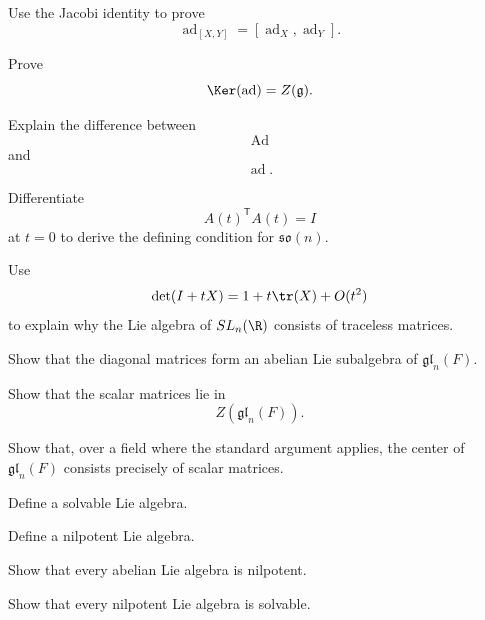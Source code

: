 \begin{exercise}[2]
Use the Jacobi identity to prove
\[ \operatorname{ad}_{[X,Y]}
=[\operatorname{ad}_X,\operatorname{ad}_Y]. \]
\end{exercise}

\begin{exercise}[2]
Prove
\[ \Ker(\operatorname{ad})=Z(\mathfrak g). \]
\end{exercise}

\begin{exercise}[1]
Explain the difference between
\[ \operatorname{Ad} \]
and
\[ \operatorname{ad}. \]
\end{exercise}

\begin{exercise}[2]
Differentiate
\[ A(t)^{\mathsf T}A(t)=I \]
at \(t=0\) to derive the defining condition for \(\mathfrak{so}(n)\).
\end{exercise}

\begin{exercise}[2]
Use
\[ \det(I+tX)=1+t\tr(X)+O(t^2) \]
to explain why the Lie algebra of \(SL_n(\R)\) consists of traceless
matrices.
\end{exercise}

\begin{exercise}[2]
Show that the diagonal matrices form an abelian Lie subalgebra of
\(\mathfrak{gl}_n(F)\).
\end{exercise}

\begin{exercise}[2]
Show that the scalar matrices lie in
\[ Z(\mathfrak{gl}_n(F)). \]
\end{exercise}

\begin{exercise}[3]
Show that, over a field where the standard argument applies, the center of
\(\mathfrak{gl}_n(F)\) consists precisely of scalar matrices.
\end{exercise}

\begin{exercise}[1]
Define a solvable Lie algebra.
\end{exercise}

\begin{exercise}[1]
Define a nilpotent Lie algebra.
\end{exercise}

\begin{exercise}[2]
Show that every abelian Lie algebra is nilpotent.
\end{exercise}

\begin{exercise}[2]
Show that every nilpotent Lie algebra is solvable.
\end{exercise}

